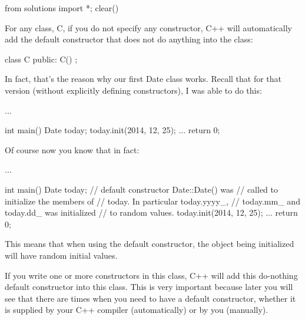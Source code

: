 \begin{python0}
from solutions import *; clear()
\end{python0}

For any class, C, if you do not specify any constructor, C++ will
automatically add the default constructor that does not do anything into
the class:

\begin{consolethree}[escapeinside=||]
class C
{
public:
    C() {}
};
\end{consolethree}

In fact, that's the reason why our first Date class
works. Recall that for that version (without explicitly defining
constructors), I was able to do this:

\begin{consolethree}[escapeinside=||]
...

int main()
{
    Date today;
    today.init(2014, 12, 25);
    ...
    return 0;
}
\end{consolethree}

Of course now you know that in fact:

\begin{consolethree}[escapeinside=||]
...

int main()
{
    Date today; // default constructor Date::Date() was
                // called to initialize the members of
                // today. In particular today.yyyy_,
                // today.mm_ and today.dd_ was initialized
                // to random values.
    today.init(2014, 12, 25);
    ...
    return 0;
}
\end{consolethree}

This means that when using the default constructor, the object
being initialized will have random initial values.

If you write one or more constructors in this class, C++ will
 add this do-nothing default constructor into this class.
This is very important because later you will see that there are times
when you need to have a default constructor, whether it is supplied by
your C++ compiler (automatically) or by you (manually).




